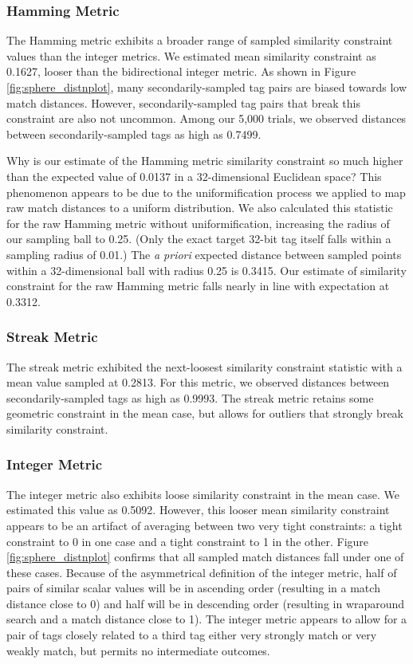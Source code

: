 \subsubsection{Hamming Metric}

The Hamming metric exhibits a broader range of sampled similarity constraint values than the integer metrics.
We estimated mean similarity constraint as 0.1627, looser than the bidirectional integer metric.
As shown in Figure \ref{fig:sphere_distnplot}, many secondarily-sampled tag pairs are biased towards low match distances.
However, secondarily-sampled tag pairs that break this constraint are also not uncommon.
Among our 5,000 trials, we observed distances between secondarily-sampled tags as high as 0.7499.

Why is our estimate of the Hamming metric similarity constraint so much higher than the expected value of 0.0137 in a 32-dimensional Euclidean space?
This phenomenon appears to be due to the uniformification process we applied to map raw match distances to a uniform distribution.
We also calculated this statistic for the raw Hamming metric without uniformification, increasing the radius of our sampling ball to 0.25.
(Only the exact target 32-bit tag itself falls within a sampling radius of 0.01.)
The \textit{a priori} expected distance between sampled points within a 32-dimensional ball with radius 0.25 is 0.3415.
Our estimate of similarity constraint for the raw Hamming metric falls nearly in line with expectation at 0.3312.

\subsubsection{Streak Metric}

The streak metric exhibited the next-loosest similarity constraint statistic with a mean value sampled at 0.2813.
For this metric, we observed distances between secondarily-sampled tags as high as 0.9993.
The streak metric retains some geometric constraint in the mean case, but allows for outliers that strongly break similarity constraint.

\subsubsection{Integer Metric}

The integer metric also exhibits loose similarity constraint in the mean case.
We estimated this value as 0.5092.
However, this looser mean similarity constraint appears to be an artifact of averaging between two very tight constraints: a tight constraint to 0 in one case and a tight constraint to 1 in the other.
Figure \ref{fig:sphere_distnplot} confirms that all sampled match distances fall under one of these cases.
Because of the asymmetrical definition of the integer metric, half of pairs of similar scalar values will be in ascending order (resulting in a match distance close to 0) and half will be in descending order (resulting in wraparound search and a match distance close to 1).
The integer metric appears to allow for a pair of tags closely related to a third tag either very strongly match or very weakly match, but permits no intermediate outcomes.

